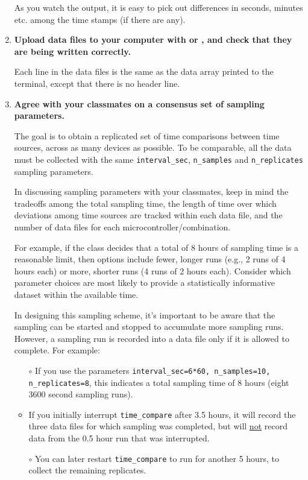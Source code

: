 \begin{enumerate}
	As you watch the output, it is easy to pick out differences in seconds, minutes etc. among the time stamps (if there are any).
	
	\item \textbf{Upload data files to your computer with \mpfshell or \webrepl, and check that they are being written correctly.}
	
	Each line in the data files is the same as the data array printed to the terminal, except that there is no header line.
	
	\item \textbf{Agree with your classmates on a consensus set of sampling parameters.}
	
	The goal is to obtain a replicated set of time comparisons between time sources, across as many devices as possible. 
	To be comparable, all the data must be collected with the same \lstinline{interval_sec}, \lstinline{n_samples} and \lstinline{n_replicates} sampling parameters.
	
	\smallskip
	In discussing sampling parameters with your classmates, keep in mind the tradeoffs among the total sampling time, the length of time over which deviations among time sources are tracked within each data file, and the number of data files for each microcontroller/\rtc combination. 
	
	\smallskip
	For example, if the class decides that a total of 8 hours of sampling time is a reasonable limit, then options include fewer, longer runs (e.g., 2 runs of 4 hours each) or more, shorter runs (4 runs of 2 hours each).
	Consider which parameter choices are most likely to provide a statistically informative dataset within the available time.
	
	\smallskip
	In designing this sampling scheme, it's important to be aware that the sampling can be started and stopped to accumulate more sampling runs.
	However, a sampling run is recorded into a data file only if it is allowed to complete.	For example:
\begin{itemize}
	\item[$\circ$] If you use the parameters \lstinline{interval_sec=6*60, n_samples=10, n_replicates=8}, this indicates a total sampling time of 8 hours (eight 3600 second sampling runs).
	
	\item[$\circ$] If you initially interrupt \lstinline{time_compare} after 3.5 hours, it will record the three data files for which sampling was completed, but will \underline{not} record data from the 0.5 hour run that was interrupted.
	
	\item[$\circ$] You can later restart \lstinline{time_compare} to run for another 5 hours, to collect the remaining replicates.
\end{itemize}		
\end{enumerate}


